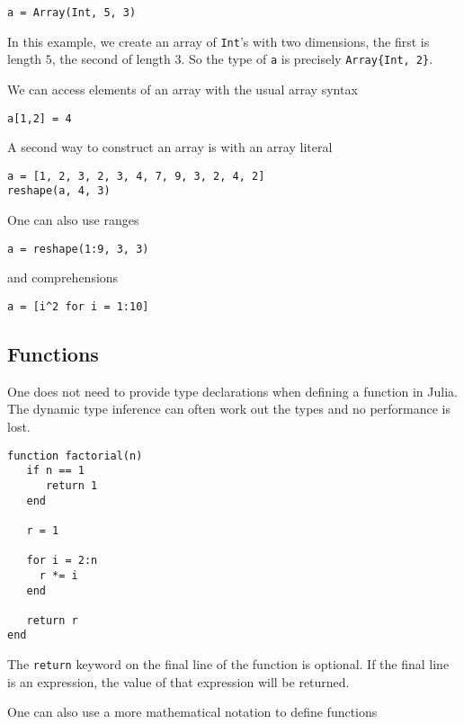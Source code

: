 \documentclass[a4paper,10pt]{article}
\newcommand{\code}{\lstinline}
\begin{document}
{\begin{lstlisting}
a = Array(Int, 5, 3)
\end{lstlisting}

In this example, we create an array of \code{Int}'s with two dimensions, the first is length $5$,
the second of length $3$. So the type of \code{a} is precisely \code|Array{Int, 2}|.

We can access elements of an array with the usual array syntax

\begin{lstlisting}
a[1,2] = 4
\end{lstlisting}

A second way to construct an array is with an array literal

\begin{lstlisting}
a = [1, 2, 3, 2, 3, 4, 7, 9, 3, 2, 4, 2]
reshape(a, 4, 3)
\end{lstlisting}

One can also use ranges

\begin{lstlisting}
a = reshape(1:9, 3, 3)
\end{lstlisting}

and comprehensions

\begin{lstlisting}
a = [i^2 for i = 1:10]
\end{lstlisting}

\subsection{Functions}

One does not need to provide type declarations when defining a function in Julia. The dynamic
type inference can often work out the types and no performance is lost.

\begin{lstlisting}
function factorial(n)
   if n == 1
      return 1
   end

   r = 1
   
   for i = 2:n
     r *= i
   end

   return r  
end
\end{lstlisting}

The \code{return} keyword on the final line of the function is optional. If the final line is 
an expression, the value of that expression will be returned.

One can also use a more mathematical notation to define functions

}
\end{document}
